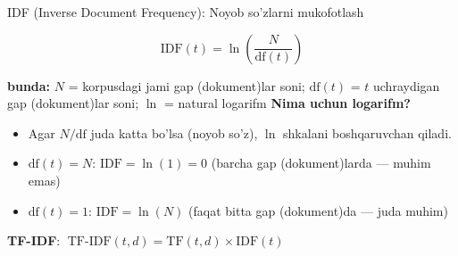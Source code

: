 \documentclass[aspectratio=169,11pt]{beamer}
\newcommand{\bunda}[1]{{\small\textbf{bunda:}\; #1}}
\begin{document}
\begin{frame}{IDF (Inverse Document Frequency): Noyob so'zlarni mukofotlash}
  \begin{tcolorbox}[defbox,title=Ta'rif: IDF --- teskari gap (dokument) chastotasi]
    \[
      \mathrm{IDF}(t)
        = \ln\!\left(\frac{N}{\mathrm{df}(t)}\right)
    \]
  \end{tcolorbox}
  \vspace{4pt}
  \bunda{%
    $N$ = korpusdagi jami gap (dokument)lar soni;
    $\mathrm{df}(t)$ = $t$ uchraydigan gap (dokument)lar soni;
    $\ln$ = natural logarifm
  }
  \vspace{4pt}
  \textbf{Nima uchun logarifm?}
  \begin{itemize}\small\setlength\itemsep{3pt}
    \item Agar $N/\mathrm{df}$ juda katta bo'lsa (noyob so'z),
          $\ln$ shkalani boshqaruvchan qiladi.
    \item $\mathrm{df}(t) = N$: $\mathrm{IDF} = \ln(1) = 0$
          \quad\textcolor{deepred}{(barcha gap (dokument)larda --- muhim emas)}
    \item $\mathrm{df}(t) = 1$: $\mathrm{IDF} = \ln(N)$
          \quad\textcolor{deepgreen}{(faqat bitta gap (dokument)da --- juda muhim)}
  \end{itemize}
  \vspace{3pt}
  \textbf{TF-IDF}: $\;\mathrm{TF\text{-}IDF}(t, d) = \mathrm{TF}(t,d) \times \mathrm{IDF}(t)$
\end{frame}
\end{document}
